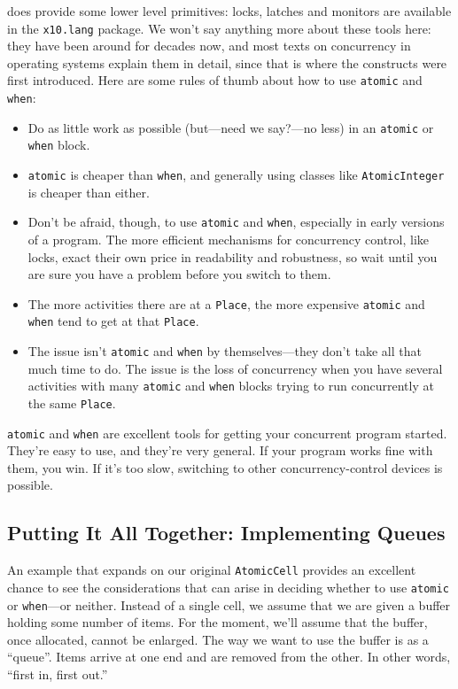 \Xten{} does provide some lower level primitives:
locks, latches and monitors are available in the {\tt x10.lang}
package.  We won't say anything more about these tools here: they
have been around for decades now, and most texts on
concurrency in operating systems explain them in detail, since that is where
the constructs were first introduced.
Here are some rules of thumb about how to use {\tt atomic} and {\tt when}: 
\begin{itemize}
\item Do as little work as possible (but---need we say?---no less) in an {\tt atomic}
      or {\tt when} block.  
\item {\tt atomic} is cheaper than {\tt when}, and generally using classes like
{\tt AtomicInteger} is cheaper than either.
\item Don't be afraid, though, to use {\tt atomic} and {\tt when}, especially in early
      versions of a program.  The more efficient mechanisms for concurrency
      control, like locks, exact their own price in readability and robustness, 
      so wait until you are sure you have a problem before you switch to them. 
\item The more activities there are at a {\tt Place}, the more expensive 
{\tt atomic} and {\tt when} tend to get at that {\tt Place}. 

\item The issue isn't {\tt atomic} and {\tt when} by themselves---they don't take
all that much time to do. The issue is the loss of concurrency when you have
several activities with many {\tt atomic} and {\tt when} blocks trying to
run concurrently at the same {\tt Place}.
\end{itemize}

{\tt atomic} and {\tt when} are excellent tools for getting your concurrent
program started. They're easy to use, and they're very general. If your
program works fine with them, you win. If it's too slow, switching to other
concurrency-control devices is possible.

\subsection{Putting It All Together: Implementing Queues}\label{ssec:queues}
An example that expands on our original {\tt AtomicCell} provides an excellent
chance to see the considerations that can arise in deciding whether to use
{\tt atomic} or {\tt when}---or neither.  Instead of a single cell, we assume that
we are given a buffer holding some number of items.  For the moment, we'll
assume that the buffer, once allocated, cannot be enlarged.  The way we
want to use the buffer is as a ``queue''.  Items arrive at one end and are
removed from the other.  In other words, ``first in, first out.''

